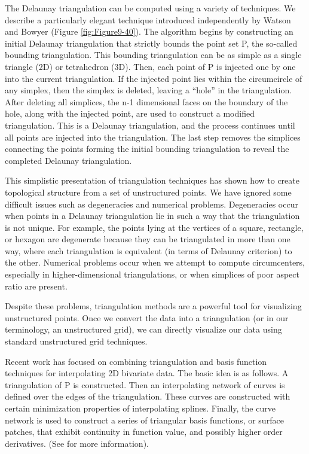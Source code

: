 \begin{description}[leftmargin=0cm,labelindent=0cm]
The Delaunay triangulation can be computed using a variety of techniques. We describe a particularly elegant technique introduced independently by Watson \cite{Watson81} and Bowyer \cite{Bowyer81} (Figure \ref{fig:Figure9-40}). The algorithm begins by constructing an initial Delaunay triangulation that strictly bounds the point set P, the so-called bounding triangulation. This bounding triangulation can be as simple as a single triangle (2D) or tetrahedron (3D). Then, each point of P is injected one by one into the current triangulation. If the injected point lies within the circumcircle of any simplex, then the simplex is deleted, leaving a ``hole'' in the triangulation. After deleting all simplices, the n-1 dimensional faces on the boundary of the hole, along with the injected point, are used to construct a modified triangulation. This is a Delaunay triangulation, and the process continues until all points are injected into the triangulation. The last step removes the simplices connecting the points forming the initial bounding triangulation to reveal the completed Delaunay triangulation.

This simplistic presentation of triangulation techniques has shown how to create topological structure from a set of unstructured points. We have ignored some difficult issues such as degeneracies and numerical problems. Degeneracies occur when points in a Delaunay triangulation lie in such a way that the triangulation is not unique. For example, the points lying at the vertices of a square, rectangle, or hexagon are degenerate because they can be triangulated in more than one way, where each triangulation is equivalent (in terms of Delaunay criterion) to the other. Numerical problems occur when we attempt to compute circumcenters, especially in higher-dimensional triangulations, or when simplices of poor aspect ratio are present.

Despite these problems, triangulation methods are a powerful tool for visualizing unstructured points. Once we convert the data into a triangulation (or in our terminology, an unstructured grid), we can directly visualize our data using standard unstructured grid techniques.


\item[Hybrid Techniques.] Recent work has focused on combining triangulation and basis function techniques for interpolating 2D bivariate data. The basic idea is as follows. A triangulation of P is constructed. Then an interpolating network of curves is defined over the edges of the triangulation. These curves are constructed with certain minimization properties of interpolating splines. Finally, the curve network is used to construct a series of triangular basis functions, or surface patches, that exhibit continuity in function value, and possibly higher order derivatives. (See \cite{Nielson91a} for more information).

\end{description}

